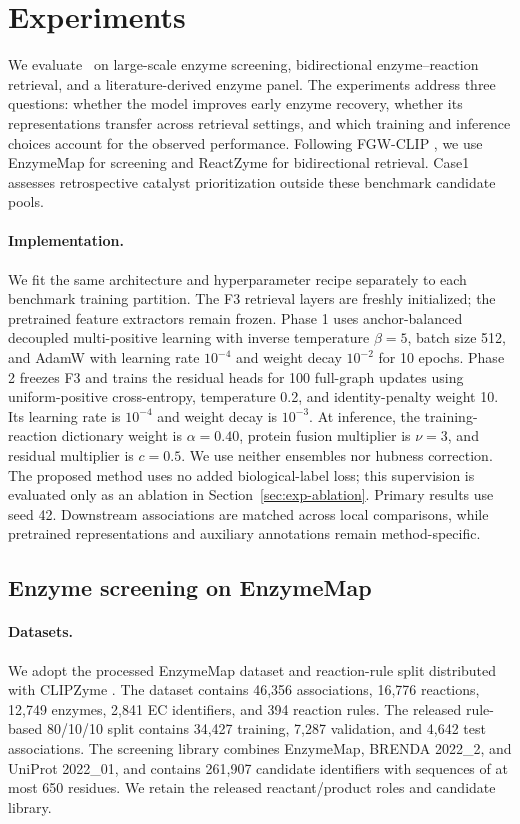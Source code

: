 \section{Experiments}
\label{sec:exp}

We evaluate \methodname\ on large-scale enzyme screening, bidirectional
enzyme--reaction retrieval, and a literature-derived enzyme panel. The
experiments address three questions: whether the model improves early
enzyme recovery, whether its representations transfer across retrieval
settings, and which training and inference choices account for the observed
performance. Following FGW-CLIP \citep{zhou2026fgwclip}, we use EnzymeMap for
screening and ReactZyme for bidirectional retrieval. Case1 assesses
retrospective catalyst prioritization outside these benchmark candidate pools.

\paragraph{Implementation.}
We fit the same architecture and hyperparameter recipe separately to each
benchmark training partition. The F3 retrieval layers are freshly initialized;
the pretrained feature extractors remain frozen. Phase 1 uses anchor-balanced
decoupled multi-positive learning with inverse temperature $\beta=5$, batch
size 512, and AdamW with learning rate $10^{-4}$ and weight decay $10^{-2}$
for 10 epochs. Phase 2 freezes F3 and trains the residual heads for 100
full-graph updates using uniform-positive cross-entropy, temperature 0.2,
and identity-penalty weight 10. Its learning rate is $10^{-4}$ and weight
decay is $10^{-3}$. At inference, the training-reaction dictionary weight is
$\alpha=0.40$, protein fusion multiplier is $\nu=3$, and residual multiplier
is $c=0.5$. We use neither ensembles nor hubness correction.
The proposed method uses no added biological-label loss; this supervision
is evaluated only as an ablation in Section~\ref{sec:exp-ablation}.
Primary results use seed 42.
Downstream associations are matched across local comparisons, while pretrained
representations and auxiliary annotations remain method-specific.

\subsection{Enzyme screening on EnzymeMap}
\label{sec:exp-screening}

\paragraph{Datasets.}
We adopt the processed EnzymeMap dataset and reaction-rule split distributed
with CLIPZyme \citep{heid2023enzymemap,mikhael2024clipzyme}. The dataset
contains 46,356 associations, 16,776 reactions, 12,749 enzymes, 2,841 EC
identifiers, and 394 reaction rules. The released rule-based 80/10/10 split
contains 34,427 training, 7,287 validation, and 4,642 test associations. The
screening library combines EnzymeMap, BRENDA 2022\_2, and UniProt 2022\_01,
and contains 261,907 candidate identifiers with sequences of at most 650
residues. We retain the released reactant/product roles and candidate library.


